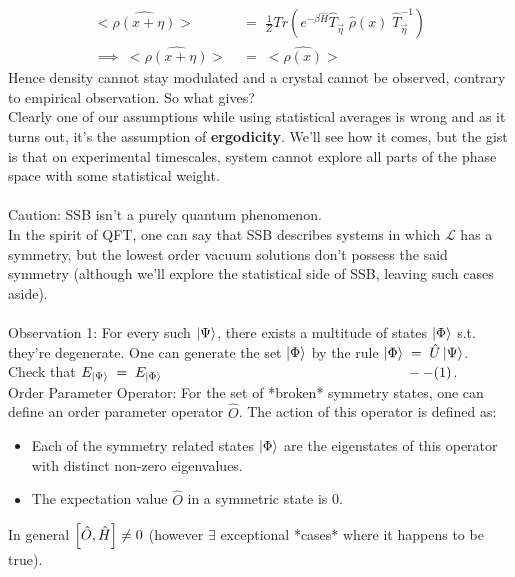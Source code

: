 \documentclass[12pt]{article}
\begin{document}
\begin{align*}
    <\hat{\rho(x+\eta)}> &= \;\frac{1}{Z}Tr(e^{-\beta \hat{H}}\hat{T}_{\Vec{\eta}}\;\hat{\rho}(x)\;\hat{T}^{-1}_{\Vec{\eta}} ) \\
    \implies\; <\hat{\rho(x+\eta)}>\;&=\; <\hat{\rho(x)}>
\end{align*}
Hence density cannot stay modulated and a crystal cannot be observed, contrary to empirical observation. So what gives?\\
Clearly one of our assumptions while using statistical averages is wrong and as it turns out, it's the assumption of \textbf{ergodicity}. We'll see how it comes, but the gist is that on experimental timescales, system cannot explore all parts of the phase space with some statistical weight.\\
\\
Caution: SSB isn't a purely quantum phenomenon.\\
\newline
In the spirit of QFT, one can say that SSB describes systems in which $\mathcal{L}$ has a symmetry, but the lowest order vacuum solutions don't possess the said symmetry (although we'll explore the statistical side of SSB, leaving such cases aside).\\
\\
Observation 1: For every such $\ket{\Psi}$, there exists a multitude of states $\ket{\Phi}$ s.t. they're degenerate.
One can generate the set {$\ket{\Phi}$} by the rule $\ket{\Phi}\;=\;\hat{U}\ket{\Psi}$.\\
Check that $E_{\ket{\Psi}}\;=\;E_{\ket{\Phi}}\;\;\;\;\;\;\;\;\;\;\;\;\;\;\;\;\;\;\;\;\;\;\;\;\;\;\;\;\;\;\;\;\;\;\;\;\;\;\;\;\;\;\;\;\;\;\;\;\;\;\;\;\;\;\;\;\;\;\;\;\;\;\;--(1)$.\\
\newline
Order Parameter Operator: For the set of *broken* symmetry states, one can define an order parameter operator $\hat{O}$.
The action of this operator is defined as:
\begin{itemize}
    \item
        Each of the symmetry related states {$\ket{\Phi}$} are the eigenstates of this operator with distinct non-zero eigenvalues.
    \item The expectation value $\hat{O}$ in a symmetric state is 0.
\end{itemize}
In general $\comm{\hat{O}}{\hat{H}}\neq 0$ (however $\exists$ exceptional *cases* where it happens to be true).\\
\\
\end{document}
